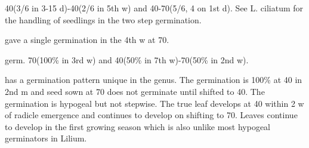 \begin{description}
40(3/6 in 3-15 d)-40(2/6 in 5th w) and 40-70(5/6, 4 on 1st d). See L. ciliatum for the
handling of seedlings in the two step germination.
\item[L. nanum] gave a single germination in the 4th w at 70.
\item[L. nepalense] germ. 70(100\% in 3rd w) and 40(50\% in 7th w)-70(50\% in 2nd w).
\item[L. nobilissimum] has a germination pattern unique in the genus. The
germination is 100\% at 40 in 2nd m and seed sown at 70 does not germinate until
shifted to 40. The germination is hypogeal but not stepwise. The true leaf develops at
40 within 2 w of radicle emergence and continues to develop on shifting to 70. Leaves
continue to develop in the first growing season which is also unlike most hypogeal
germinators in Lilium.


\end{description}
